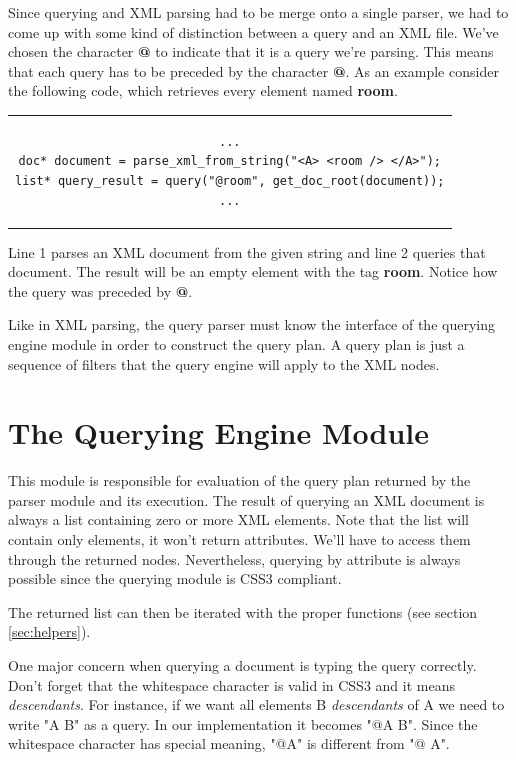 \documentclass[a4paper]{report}
\begin{document}
		Since querying and XML parsing had to be merge onto a single parser, we had to come up with some kind of distinction between a query and an XML file. We've chosen the character \textbf{@} to indicate that it is a 
		query we're parsing. This means that each query has to be preceded by the character \textbf{@}. As an example consider the following code, which retrieves every element named \textbf{room}.
		
\begin{center}
	\lstset{language=C,numbers=left, captionpos=b, caption=Sample query to a DOM tree.}
		\begin{tabular}{c}
	\begin{lstlisting}		
...
doc* document = parse_xml_from_string("<A> <room /> </A>");
list* query_result = query("@room", get_doc_root(document));
...
	\end{lstlisting}		
	\end{tabular}
	\end{center}
	
		Line 1 parses an XML document from the given string and line 2 queries that document. The result will be an empty element with the tag \textbf{room}. Notice how the query was preceded by \textbf{@}.
			
		Like in XML parsing, the query parser must know the interface of the querying engine module in order to construct the query plan. A query plan is just a sequence of filters that the query engine will apply to the XML
		nodes.
		
\section{The Querying Engine Module}\label{sec:sels}
	This module is responsible for evaluation of the query plan returned by the parser module and its execution. The result of querying an XML document is always a list containing zero or more XML elements. Note that the list
	will contain only elements, it won't return attributes. We'll have to access them through the returned nodes. Nevertheless, querying by attribute is always possible since the querying module is CSS3 compliant.

	The returned list can then be iterated with the proper functions (see section \ref{sec:helpers}).

	One major concern when querying a document is typing the query correctly. Don't forget that the whitespace character is valid in CSS3 and it means \emph{descendants}. For instance, if we want all elements B 
	\emph{descendants} of A we need to write "A B" as a query. In our implementation it becomes "@A B". Since the whitespace character has special meaning, "@A" is different from "@ A". 	
	
\end{document}
